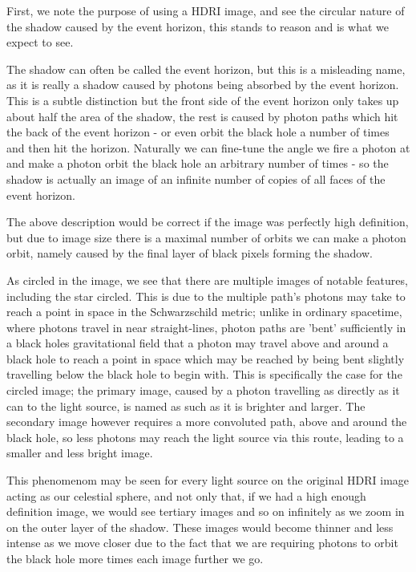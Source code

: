 \documentclass[oneside,openright,frontopenright, singlespacing]{dmathesis}
\begin{document}
	First, we note the purpose of using a HDRI image, and see the circular nature of the shadow caused by the event horizon, this stands to reason and is what we expect to see. 

\vspace{1em}
	The shadow can often be called the event horizon, but this is a misleading name, as it is really a shadow caused by photons being absorbed by the event horizon. This is a subtle distinction but the front side of the event horizon only takes up about half the area of the shadow, the rest is caused by photon paths which hit the back of the event horizon - or even orbit the black hole a number of times and then hit the horizon. Naturally we can fine-tune the angle we fire a photon at and make a photon orbit the black hole an arbitrary number of times - so the shadow is actually an image of an infinite number of copies of all faces of the event horizon.

\vspace{1em}
	The above description would be correct if the image was perfectly high definition, but due to image size there is a maximal number of orbits we can make a photon orbit, namely caused by the final layer of black pixels forming the shadow.

\vspace{1em}
	As circled in the image, we see that there are multiple images of notable features, including the star circled. This is due to the multiple path's photons may take to reach a point in space in the Schwarzschild metric; unlike in ordinary spacetime, where photons travel in near straight-lines, photon paths are 'bent' sufficiently in a black holes gravitational field that a photon may travel above and around a black hole to reach a point in space which may be reached by being bent slightly travelling below the black hole to begin with. This is specifically the case for the circled image; the primary image, caused by a photon travelling as directly as it can to the light source, is named as such as it is brighter and larger. The secondary image however requires a more convoluted path, above and around the black hole, so less photons may reach the light source via this route, leading to a smaller and less bright image.

\vspace{1em}
	This phenomenom may be seen for every light source on the original HDRI image acting as our celestial sphere, and not only that, if we had a high enough definition image, we would see tertiary images and so on infinitely as we zoom in on the outer layer of the shadow. These images would become thinner and less intense as we move closer due to the fact that we are requiring photons to orbit the black hole more times each image further we go.
\end{document}
